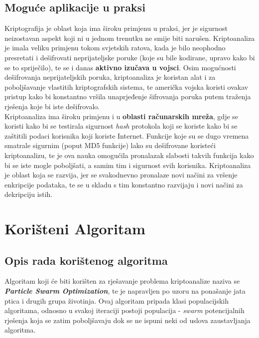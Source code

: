 \documentclass[12pt, a4paper]{article}
\begin{document}
\subsection{Moguće aplikacije u praksi}

Kriptografija je oblast koja ima široku primjenu u praksi, jer je sigurnost neizostavan aspekt koji ni u jednom trenutku ne smije biti narušen. Kriptoanaliza je imala veliku primjenu tokom svjetskih ratova, kada je bilo neophodno presretati i dešifrovati neprijateljske poruke (koje su bile kodirane, upravo kako bi se to spriječilo), te se i danas \textbf{aktivno izučava u vojsci}. Osim mogućnosti dešifrovanja neprijateljskih poruka, kriptoanaliza je koristan alat i za poboljšavanje vlastitih kriptografskih sistema, te američka vojska koristi ovakav pristup kako bi konstantno vršila unaprjeđenje šifrovanja poruka putem traženja rješenja koje bi iste dešifrovalo. \cite{manual} \\

Kriptoanaliza ima široku primjenu i u \textbf{oblasti računarskih mreža}, gdje se koristi kako bi se testirala sigurnost \textit{hash} protokola koji se koriste kako bi se zaštitili podaci korisnika koji koriste Internet. Funkcije koje su se dugo vremena smatrale sigurnim (poput MD5 funkcije) lako su dešifrovane koristeći kriptoanalizu, te je ova nauka omogućila pronalazak slabosti takvih funkcija kako bi se iste mogle poboljšati, a samim tim i sigurnost svih korisnika. \cite{thesis2} Kriptoanaliza je oblast koja se razvija, jer se svakodnevno pronalaze novi načini za vršenje enkripcije podataka, te se u skladu s tim konstantno razvijaju i novi načini za dekripciju istih.

\newpage

\section{Korišteni Algoritam}

\subsection{Opis rada korištenog algoritma}

Algoritam koji će biti korišten za rješavanje problema kriptoanalize naziva se \textbf{\textit{Particle Swarm Optimization}}, te je napravljen po uzoru na ponašanje jata ptica i drugih grupa životinja. Ovaj algoritam pripada klasi populacijskih algoritama, odnosno u svakoj iteraciji postoji populacija - \textit{swarm} potencijalnih rješenja koja se zatim poboljšavaju dok se ne ispuni neki od uslova zaustavljanja algoritma. \cite{pso}\\
\end{document}
